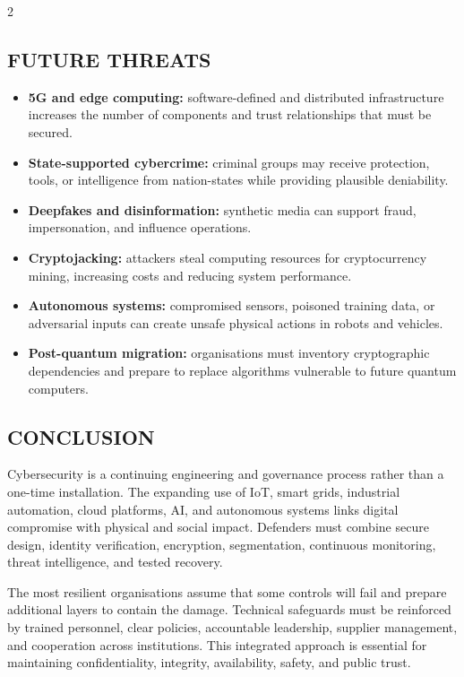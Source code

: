 \begin{multicols}{2}
  \subsection*{\centering\uppercase{Future Threats}}
  \begin{itemize}\justifying
    \item \textbf{5G and edge computing:} software-defined and distributed infrastructure increases the number of components and trust relationships that must be secured.
    \item \textbf{State-supported cybercrime:} criminal groups may receive protection, tools, or intelligence from nation-states while providing plausible deniability.
    \item \textbf{Deepfakes and disinformation:} synthetic media can support fraud, impersonation, and influence operations.
    \item \textbf{Cryptojacking:} attackers steal computing resources for cryptocurrency mining, increasing costs and reducing system performance.
    \item \textbf{Autonomous systems:} compromised sensors, poisoned training data, or adversarial inputs can create unsafe physical actions in robots and vehicles.
    \item \textbf{Post-quantum migration:} organisations must inventory cryptographic dependencies and prepare to replace algorithms vulnerable to future quantum computers.
  \end{itemize}

  \subsection*{\centering\uppercase{Conclusion}}
  Cybersecurity is a continuing engineering and governance process rather than a one-time installation. The expanding use of IoT, smart grids, industrial automation, cloud platforms, AI, and autonomous systems links digital compromise with physical and social impact. Defenders must combine secure design, identity verification, encryption, segmentation, continuous monitoring, threat intelligence, and tested recovery.

  \noindent
  The most resilient organisations assume that some controls will fail and prepare additional layers to contain the damage. Technical safeguards must be reinforced by trained personnel, clear policies, accountable leadership, supplier management, and cooperation across institutions. This integrated approach is essential for maintaining confidentiality, integrity, availability, safety, and public trust.


\end{multicols}
